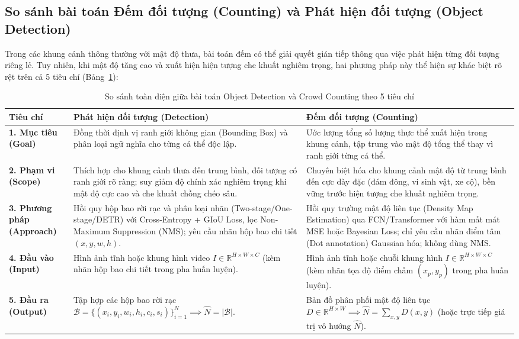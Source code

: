 \subsection{So sánh bài toán Đếm đối tượng (Counting) và Phát hiện đối tượng (Object Detection)}

Trong các khung cảnh thông thường với mật độ thưa, bài toán đếm có thể giải quyết gián tiếp thông qua việc phát hiện từng đối tượng riêng lẻ. Tuy nhiên, khi mật độ tăng cao và xuất hiện hiện tượng che khuất nghiêm trọng, hai phương pháp này thể hiện sự khác biệt rõ rệt trên cả 5 tiêu chí (Bảng~\ref{tab:comp_detection_counting}):

\begin{table}[H]
\centering
\small
\caption{So sánh toàn diện giữa bài toán Object Detection và Crowd Counting theo 5 tiêu chí}
\label{tab:comp_detection_counting}
\renewcommand{\arraystretch}{1.3}
\begin{tabularx}{\textwidth}{|p{2.8cm}|X|X|}
\hline
\textbf{Tiêu chí} & \textbf{Phát hiện đối tượng (Detection)} & \textbf{Đếm đối tượng (Counting)} \\
\hline
\textbf{1. Mục tiêu (Goal)} & Đồng thời định vị ranh giới không gian (Bounding Box) và phân loại ngữ nghĩa cho từng cá thể độc lập. & Ước lượng tổng số lượng thực thể xuất hiện trong khung cảnh, tập trung vào mật độ tổng thể thay vì ranh giới từng cá thể. \\
\hline
\textbf{2. Phạm vi (Scope)} & Thích hợp cho khung cảnh thưa đến trung bình, đối tượng có ranh giới rõ ràng; suy giảm độ chính xác nghiêm trọng khi mật độ cực cao và che khuất chồng chéo sâu. & Chuyên biệt hóa cho khung cảnh mật độ từ trung bình đến cực dày đặc (đám đông, vi sinh vật, xe cộ), bền vững trước hiện tượng che khuất nghiêm trọng. \\
\hline
\textbf{3. Phương pháp (Approach)} & Hồi quy hộp bao rời rạc và phân loại nhãn (Two-stage/One-stage/DETR) với Cross-Entropy + GIoU Loss, lọc Non-Maximum Suppression (NMS); yêu cầu nhãn hộp bao chi tiết $(x, y, w, h)$. & Hồi quy trường mật độ liên tục (Density Map Estimation) qua FCN/Transformer với hàm mất mát MSE hoặc Bayesian Loss; chỉ yêu cầu nhãn điểm tâm (Dot annotation) Gaussian hóa; không dùng NMS. \\
\hline
\textbf{4. Đầu vào (Input)} & Hình ảnh tĩnh hoặc khung hình video $I \in \mathbb{R}^{H \times W \times C}$ (kèm nhãn hộp bao chi tiết trong pha huấn luyện). & Hình ảnh tĩnh hoặc chuỗi khung hình $I \in \mathbb{R}^{H \times W \times C}$ (kèm nhãn tọa độ điểm chấm $(x_p, y_p)$ trong pha huấn luyện). \\
\hline
\textbf{5. Đầu ra (Output)} & Tập hợp các hộp bao rời rạc $\mathcal{B} = \{(x_i, y_i, w_i, h_i, c_i, s_i)\}_{i=1}^N \implies \hat{N} = |\mathcal{B}|$. & Bản đồ phân phối mật độ liên tục $D \in \mathbb{R}^{H \times W} \implies \hat{N} = \sum_{x,y} D(x, y)$ (hoặc trực tiếp giá trị vô hướng $\hat{N}$). \\
\hline
\end{tabularx}
\end{table}

